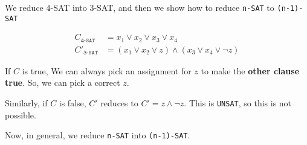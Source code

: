 We reduce 4-SAT into 3-SAT, and then we show how to reduce \texttt{n-SAT} to \texttt{(n-1)-SAT}

\begin{align*}
    C_{\texttt{4-SAT}} &= x_1 \lor x_2 \lor x_3 \lor x_4 \\
    C'_{\texttt{3-SAT}} &= (x_1 \lor x_2 \lor z) \land (x_3 \lor x_4 \lor \lnot{z})
\end{align*}

If $C$ is true, We can always pick an assignment for $z$ to make the \textbf{other clause true}.
So, we can pick a correct $z$.

Similarly, if $C$ is false, $C'$ reduces to $C' = z \land \lnot{z}$. This 
is \texttt{UNSAT}, so this is not possible.

Now, in general, we reduce \texttt{n-SAT} into \texttt{(n-1)-SAT}.
